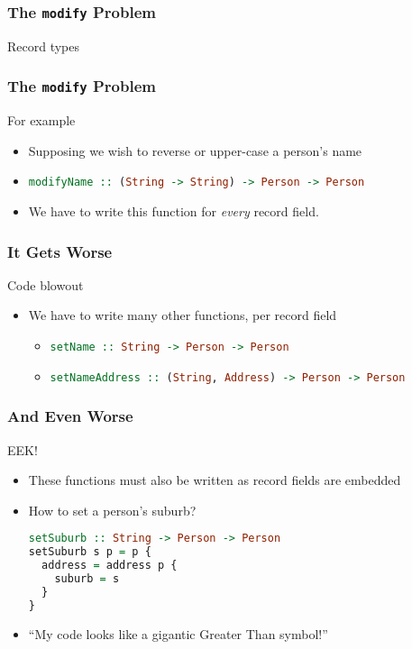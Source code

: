\begin{frame}
\frametitle{The \lstinline$modify$ Problem}

\begin{block}{Record types}

\end{block}

\end{frame}

\begin{frame}
\frametitle{The \lstinline$modify$ Problem}

\begin{block}{For example}
\begin{itemize}
\item Supposing we wish to reverse or upper-case a person's name
\item \lstinline[language=haskell]$modifyName :: (String -> String) -> Person -> Person$
\item We have to write this function for \emph{every} record field.
\end{itemize}
\end{block}

\end{frame}

\begin{frame}
\frametitle{It Gets Worse}

\begin{block}{Code blowout}
\begin{itemize}
\item We have to write many other functions, per record field
  \begin{itemize}
  \item \lstinline[language=haskell]$setName :: String -> Person -> Person$
  \item \lstinline[language=haskell]$setNameAddress :: (String, Address) -> Person -> Person$
  \end{itemize}
\end{itemize}
\end{block}

\end{frame}

\begin{frame}[fragile]
\frametitle{And Even Worse}

\begin{block}{EEK!}
\begin{itemize}
\item These functions must also be written as record fields are embedded
\item How to set a person's suburb?
\begin{lstlisting}[language=haskell]
setSuburb :: String -> Person -> Person
setSuburb s p = p {
  address = address p {
    suburb = s
  }
}
\end{lstlisting}
\item ``My code looks like a gigantic Greater Than symbol!''

\end{itemize}
\end{block}

\end{frame}


